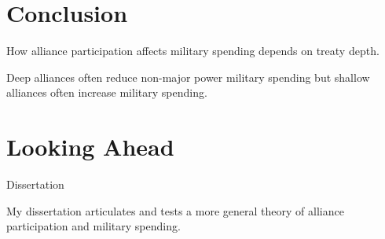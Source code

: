 \documentclass[12pt]{beamer}
\begin{document}

\section{Conclusion}


\begin{frame}[standout]

How alliance participation affects military spending depends on treaty depth.  

\end{frame}

 \begin{frame}[standout]

Deep alliances often reduce non-major power military spending but shallow alliances often increase military spending. 

 \end{frame}



\section{Looking Ahead}


\begin{frame}{Dissertation}

My dissertation articulates and tests a more general theory of alliance participation and military spending. 

\end{frame}


\end{document}
